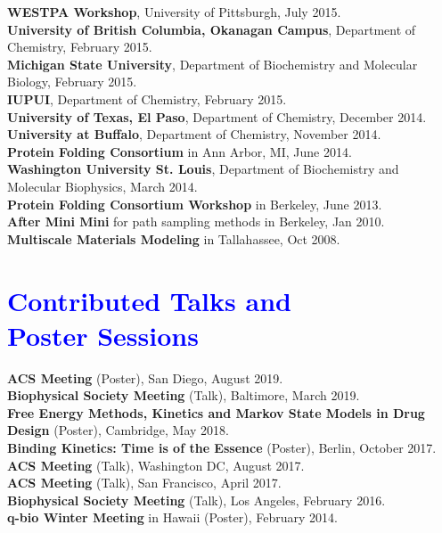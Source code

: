 \documentclass[margin,line]{res}
\begin{document}
\begin{resume}
{\bf WESTPA Workshop}, University of Pittsburgh, July 2015. \\
{\bf University of British Columbia, Okanagan Campus}, Department of Chemistry, February 2015. \\
{\bf Michigan State University}, Department of Biochemistry and Molecular Biology, February 2015. \\
{\bf IUPUI}, Department of Chemistry, February 2015. \\
{\bf University of Texas, El Paso}, Department of Chemistry, December 2014. \\
{\bf University at Buffalo}, Department of Chemistry, November 2014. \\
{\bf Protein Folding Consortium} in Ann Arbor, MI, June 2014. \\
{\bf Washington University St. Louis}, Department of Biochemistry and Molecular Biophysics, March 2014. \\
{\bf Protein Folding Consortium Workshop} in Berkeley, June 2013. \\
{\bf After Mini Mini} for path sampling methods in Berkeley, Jan 2010. \\
{\bf Multiscale Materials Modeling} in Tallahassee, Oct 2008. \\

\section{\sc \textcolor{blue}{ Contributed Talks and \\ Poster Sessions}}

{\bf ACS Meeting} (Poster), San Diego, August 2019. \\
{\bf Biophysical Society Meeting} (Talk), Baltimore, March 2019.\\
{\bf Free Energy Methods, Kinetics and Markov State Models in Drug Design} (Poster), Cambridge, May 2018. \\
{\bf Binding Kinetics: Time is of the Essence} (Poster), Berlin, October 2017.\\
{\bf ACS Meeting} (Talk), Washington DC, August 2017. \\
{\bf ACS Meeting} (Talk), San Francisco, April 2017. \\
{\bf Biophysical Society Meeting} (Talk), Los Angeles, February 2016. \\
{\bf q-bio Winter Meeting} in Hawaii (Poster), February 2014. \\



\end{resume}
\end{document}
